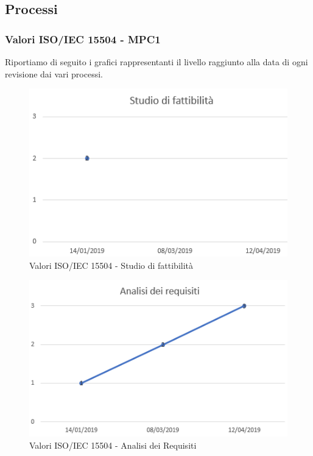 \subsection{Processi}
\subsubsection{Valori ISO/IEC 15504 - MPC1}

Riportiamo di seguito i grafici rappresentanti il livello raggiunto alla data di ogni revisione dai vari processi.


\begin{figure}[H]
	\centering
	\includegraphics[scale=1]{images/resoconto/Studio.png}
	\caption{Valori ISO/IEC 15504 - Studio di fattibilità}	
\end{figure}


\begin{figure}[H]
	\centering
	\includegraphics[scale=1]{images/resoconto/Analisi.png}
	\caption{Valori ISO/IEC 15504 - Analisi dei Requisiti}	
\end{figure}


